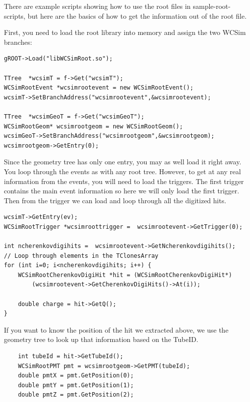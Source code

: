 


There are example scripts showing how to use the root files in sample-root-scripts, but here are the basics of how to get the information out of the root file.

First, you need to load the root library into memory and assign the two WCSim branches:
\begin{lstlisting}
gROOT->Load("libWCSimRoot.so");

TTree  *wcsimT = f->Get("wcsimT");
WCSimRootEvent *wcsimrootevent = new WCSimRootEvent();
wcsimT->SetBranchAddress("wcsimrootevent",&wcsimrootevent);

TTree  *wcsimGeoT = f->Get("wcsimGeoT");
WCSimRootGeom* wcsimrootgeom = new WCSimRootGeom();
wcsimGeoT->SetBranchAddress("wcsimrootgeom",&wcsimrootgeom);  
wcsimrootgeom->GetEntry(0);
\end{lstlisting}

Since the geometry tree has only one entry, you may as well load it right away.  You loop through the events as with any root tree.   However, to get at any real information from the events, you will need to load the triggers.  The first trigger contains the main event information so here we will only load the first trigger.  Then from the trigger we can load and loop through all the digitized hits.

\begin{lstlisting}
wcsimT->GetEntry(ev);
WCSimRootTrigger *wcsimroottrigger =  wcsimrootevent->GetTrigger(0);

int ncherenkovdigihits =  wcsimrootevent->GetNcherenkovdigihits(); 
// Loop through elements in the TClonesArray
for (int i=0; i<ncherenkovdigihits; i++) {
    WCSimRootCherenkovDigiHit *hit = (WCSimRootCherenkovDigiHit*)
        (wcsimrootevent->GetCherenkovDigiHits()->At(i));

    double charge = hit->GetQ();
}
\end{lstlisting}

If you want to know the position of the hit we extracted above, we use the geometry tree to look up that information based on the TubeID.

\begin{lstlisting}
    int tubeId = hit->GetTubeId();
    WCSimRootPMT pmt = wcsimrootgeom->GetPMT(tubeId);
    double pmtX = pmt.GetPosition(0);
    double pmtY = pmt.GetPosition(1);
    double pmtZ = pmt.GetPosition(2);
\end{lstlisting}

